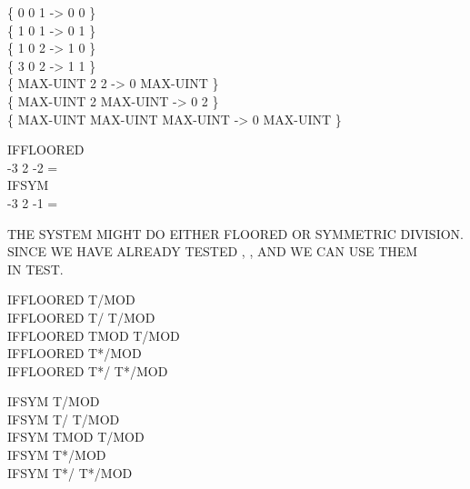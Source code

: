 \begin{tt}
\{        0                   0        1  -> 0        0 \} \\
\{        1                   0        1  -> 0        1 \} \\
\{        1                   0        2  -> 1        0 \} \\
\{        3                   0        2  -> 1        1 \} \\
\{ MAX-UINT        2         2  -> 0 MAX-UINT \} \\
\{ MAX-UINT        2  MAX-UINT  -> 0        2 \} \\
\{ MAX-UINT MAX-UINT  MAX-UINT  -> 0 MAX-UINT \}

\word{:} IFFLOORED \\
\tab \word{[} -3 2 \word{/} -2 =  \word{]}
	    
\word{;} \\
\word{:} IFSYM \\
\tab \word{[} -3 2 \word{/} -1 =  \word{]}
	    
\word {;}

 THE SYSTEM MIGHT DO EITHER FLOORED OR SYMMETRIC DIVISION. \\
 SINCE WE HAVE ALREADY TESTED , , AND  WE CAN USE THEM \\
 IN TEST.

IFFLOORED \tab  \word{:} T/MOD      \word{;} \\
IFFLOORED \tab	\word{:} T/ T/MOD   \word{;} \\
IFFLOORED \tab 	\word{:} TMOD T/MOD  \word{;} \\
IFFLOORED \tab	\word{:} T*/MOD     \word{;} \\
IFFLOORED \tab	\word{:} T*/ T*/MOD   \word{;}

IFSYM \tab[2.6] \word{:} T/MOD      \word{;} \\
IFSYM \tab[2.6] \word{:} T/ T/MOD   \word{;} \\
IFSYM \tab[2.6]	\word{:} TMOD T/MOD  \word{;} \\
IFSYM \tab[2.6]	\word{:} T*/MOD     \word{;} \\
IFSYM \tab[2.6]	\word{:} T*/ T*/MOD   \word{;}


\end{tt}
